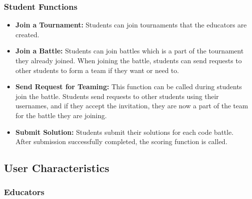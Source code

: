 \subsubsection{Student Functions}
\begin{itemize}
    \item \textbf{Join a Tournament:} Students can join tournaments that the educators are created.

    \item \textbf{Join a Battle:} Students can join battles which is a part of the tournament they already joined. When joining the battle, students can send requests to other students to form a team if they want or need to.

    \item \textbf{Send Request for Teaming:} This function can be called during students join the battle. Students send requests to other students using their usernames, and if they accept the invitation, they are now a part of the team for the battle they are joining.

    \item \textbf{Submit Solution:} Students submit their solutions for each code battle. After submission successfully completed, the scoring function is called.
\end{itemize}





\newpage
\subsection{User Characteristics}

\subsubsection{Educators}

